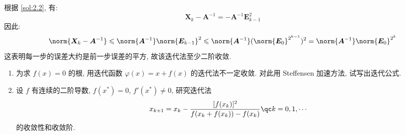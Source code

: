 \documentclass[lang = zh]{iwork}
\begin{document}
\begin{sol}
\begin{enumerate}
          根据 \ref{sol:2.2}, 有:
          \begin{equation*}
            \bm{X}_k - \bm{A}^{-1} = -\bm{A}^{-1} \bm{E}_{k-1}^2
          \end{equation*}
          因此:
          \begin{equation*}
            \norm{\bm{X}_k - \bm{A}^{-1}}
            \leqslant \norm{\bm{A}^{-1}} \norm{\bm{E}_{k-1}}^2
            \leqslant \norm{\bm{A}^{-1}} (\norm{\bm{E}_0}^{2^{k-1}})^2
            = \norm{\bm{A}^{-1}} \norm{\bm{E}_0}^{2^k}
          \end{equation*}
          这表明每一步的误差大约是前一步误差的平方, 故该迭代法至少二阶收敛.
  \end{enumerate}
\end{sol}

\begin{prob}
  \begin{enumerate}
    \item 为求 $f(x) = 0$ 的根, 用迭代函数 $\varphi(x) = x + f(x)$ 的迭代法不一定收敛.
          对此用 Steffensen 加速方法, 试写出迭代公式.
    \item 设 $f$ 有连续的二阶导数, $f(x^*) = 0$, $f'(x^*) \neq 0$, 研究迭代法
          \begin{equation*}
            x_{k + 1} = x_k - \frac{[f(x_k)]^2}{f(x_k + f(x_k)) - f(x_k)} \qc
            k = 0, 1, \cdots
          \end{equation*}
          的收敛性和收敛阶.
  \end{enumerate}
\end{prob}
\end{document}
